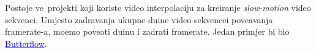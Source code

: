 Postoje ve\cj\ projekti koji koriste video interpolaciju za kreiranje \textit{slow-motion} video sekvenci. Umjesto zadr\zh avanja ukupne du\zh ine video sekvencei pove\cj avanja framerate-a, mo\zh emo pove\cj ati du\zh inu i zadr\zh ati framerate.
Jedan primjer bi bio \href{https://github.com/dthpham/butterflow}{\textcolor{blue}{Butterflow}}\cite{butterflow}.